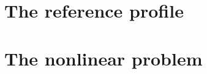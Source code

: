 \part{The reference profile}
\label{part:reference}




\part{The nonlinear problem}
\label{part:nonlinear}





\appendix







